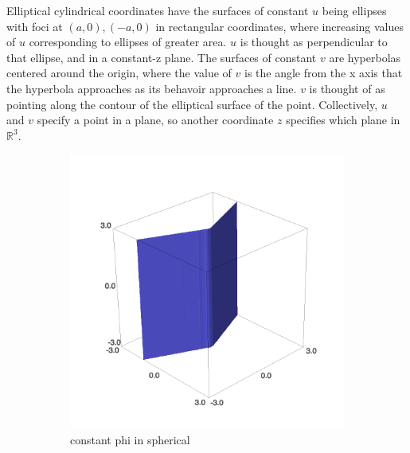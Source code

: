 \documentclass{article}
\begin{document}
Elliptical cylindrical coordinates have the surfaces of constant $u$ being ellipses with foci at $(a,0), (-a,0)$ in rectangular coordinates, where increasing values of $u$ corresponding to ellipses of greater area. $\unit{u}$ is thought as perpendicular to that ellipse, and in a constant-z plane. The surfaces of constant $v$ are hyperbolas centered around the origin, where the value of $v$ is the angle from the x axis that the hyperbola approaches as its behavoir approaches a line. $\unit{v}$ is thought of as pointing along the contour of the elliptical surface of the point. Collectively, $u$ and $v$ specify a point in a plane, so another coordinate $z$ specifies which plane in $\mathbb{R}^3$.

\begin{figure}
    \centering
    \begin{subfigure}[b]{0.3\textwidth}
        \includegraphics[width=\textwidth]{images/spherical_phi.png}
        \caption{constant phi in spherical}
    \end{subfigure}
    \begin{subfigure}[b]{0.3\textwidth}

\end{subfigure}
\end{figure}
\end{document}
